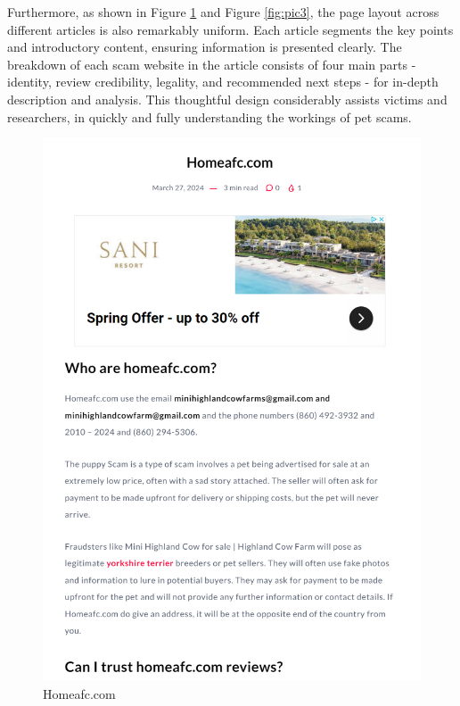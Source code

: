 \documentclass[ oneside,%
                    author={Cassie Qing Tang},
                    degree={BSc},
                     title={An Automated Response System for Disrupting Online Pet Scamming \\ },
                    subtitle={ }]{dissertation}
\begin{document}
Furthermore, as shown in Figure \ref{fig:pic2} and Figure \ref{fig:pic3}, the page layout across different articles is also remarkably uniform. Each article segments the key points and introductory content, ensuring information is presented clearly. The breakdown of each scam website in the article consists of four main parts - identity, review credibility, legality, and recommended next steps - for in-depth description and analysis. This thoughtful design considerably assists victims and researchers, in quickly and fully understanding the workings of pet scams.
\begin{figure}[H]
    \centering
    \begin{minipage}{0.45\textwidth}
        \includegraphics[width=\linewidth]{pic/figure2.png}
        \caption{Homeafc.com}
        \label{fig:pic2}
    \end{minipage}
    \hfill

\end{figure}
\end{document}
